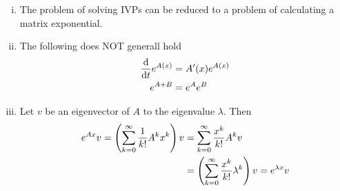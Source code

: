 \documentclass[../../script.tex]{subfiles}
\begin{document}
\begin{rem}
    \begin{enumerate}[(i)]
        \item The problem of solving IVPs can be reduced to a problem of calculating a matrix exponential.
        \item The following does NOT generall hold 
        \begin{align*}
            \dv{t}e^{A(x)} &= A'(x) e^{A(x)} \\
            e^{A + B} &= e^A e^B
        \end{align*}
        \item Let $v$ be an eigenvector of $A$ to the eigenvalue $\lambda$. Then 
        \begin{align*}
            e^{Ax} v = \left(\sum_{k=0}^{\infty} \frac{1}{k!} A^k x^k\right) v &= \sum_{k=0}^{\infty} \frac{x^k}{k!} A^k v \\
            &= \left(\sum_{k=0}^{\infty} \frac{x^k}{k!} \lambda^k\right) v = e^{\lambda x} v
        \end{align*}
    \end{enumerate}
\end{rem}
\end{document}
